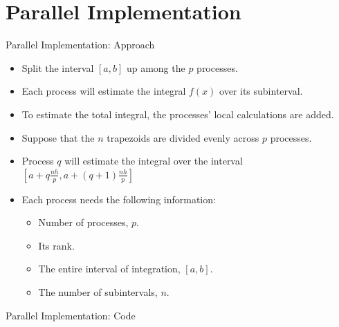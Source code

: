 \documentclass[t]{beamer}
\begin{document}
\section{Parallel Implementation}
\begin{frame}{Parallel Implementation: Approach}
	\begin{itemize}
		\item Split the interval $[a,b]$ up among the $p$ processes.
		\item Each process will estimate the integral $f(x)$ over its subinterval.
		\item To estimate the total integral, the processes’ local calculations are added.
		\item Suppose that the $n$ trapezoids are divided evenly across $p$ processes.
		\item Process $q$ will estimate the integral over the interval \\
		$[a + q\frac{nh}{p}, a + (q + 1)\frac{nh}{p}]$
		
		\item Each process needs the following information:
		\begin{itemize}
			\item Number of processes, $p$.
			\item Its rank.
			\item The entire interval of integration, $[a, b]$.
			\item The number of subintervals, $n$.
		\end{itemize}
	\end{itemize}
\end{frame}

\begin{frame}{Parallel Implementation: Code}
\end{frame}
\end{document}
